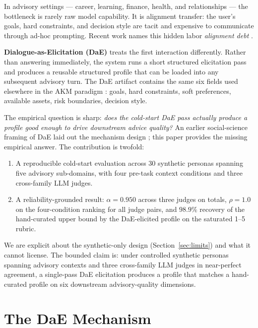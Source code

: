 \documentclass[11pt]{article}
\begin{document}
In advisory settings --- career, learning, finance, health, and relationships --- the bottleneck is rarely raw model capability. It is alignment transfer: the user's goals, hard constraints, and decision style are tacit and expensive to communicate through ad-hoc prompting. Recent work names this hidden labor \emph{alignment debt} \citep{oyemike2025alignment}.

\textbf{Dialogue-as-Elicitation (DaE)} treats the first interaction differently. Rather than answering immediately, the system runs a short structured elicitation pass and produces a reusable structured profile that can be loaded into any subsequent advisory turn. The DaE artifact contains the same six fields used elsewhere in the AKM paradigm \citep{shao2026akm}: goals, hard constraints, soft preferences, available assets, risk boundaries, decision style.

The empirical question is sharp: \emph{does the cold-start DaE pass actually produce a profile good enough to drive downstream advice quality?} An earlier social-science framing of DaE laid out the mechanism design \citep{shao2025dae}; this paper provides the missing empirical answer. The contribution is twofold:

\begin{enumerate}[leftmargin=1.5em]
\item A reproducible cold-start evaluation across 30 synthetic personas spanning five advisory sub-domains, with four pre-task context conditions and three cross-family LLM judges.
\item A reliability-grounded result: $\alpha = 0.950$ across three judges on totals, $\rho = 1.0$ on the four-condition ranking for all judge pairs, and $98.9\%$ recovery of the hand-curated upper bound by the DaE-elicited profile on the saturated 1--5 rubric.
\end{enumerate}

We are explicit about the synthetic-only design (Section~\ref{sec:limits}) and what it cannot license. The bounded claim is: under controlled synthetic personas spanning advisory contexts and three cross-family LLM judges in near-perfect agreement, a single-pass DaE elicitation produces a profile that matches a hand-curated profile on six downstream advisory-quality dimensions.

\section{The DaE Mechanism}
\end{document}
